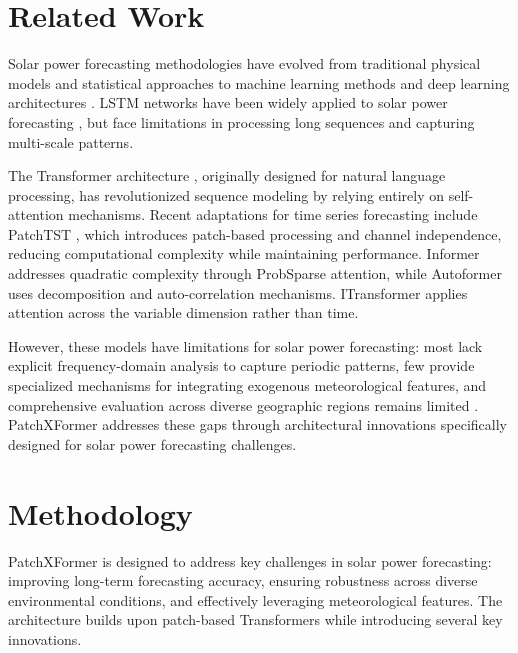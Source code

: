 \documentclass[conference]{IEEEtran}
\begin{document}
\section{Related Work}

Solar power forecasting methodologies have evolved from traditional physical models \cite{de2006improvement} and statistical approaches \cite{box2015time} to machine learning methods \cite{voyant2017machine,persson2017multi} and deep learning architectures \cite{lecun2015deep,han2019review}. LSTM networks \cite{hochreiter1997long} have been widely applied to solar power forecasting \cite{lim2022solar,jebli2021deep}, but face limitations in processing long sequences and capturing multi-scale patterns.

The Transformer architecture \cite{vaswani2017attention}, originally designed for natural language processing, has revolutionized sequence modeling by relying entirely on self-attention mechanisms. Recent adaptations for time series forecasting include PatchTST \cite{nie2022patchtst}, which introduces patch-based processing and channel independence, reducing computational complexity while maintaining performance. Informer \cite{zhou2021informer} addresses quadratic complexity through ProbSparse attention, while Autoformer \cite{wu2021autoformer} uses decomposition and auto-correlation mechanisms. ITransformer \cite{liu2023itransformer} applies attention across the variable dimension rather than time.

However, these models have limitations for solar power forecasting: most lack explicit frequency-domain analysis to capture periodic patterns, few provide specialized mechanisms for integrating exogenous meteorological features, and comprehensive evaluation across diverse geographic regions remains limited \cite{alali2023solar,sherozbek2023transformers}. PatchXFormer addresses these gaps through architectural innovations specifically designed for solar power forecasting challenges.

\section{Methodology}

PatchXFormer is designed to address key challenges in solar power forecasting: improving long-term forecasting accuracy, ensuring robustness across diverse environmental conditions, and effectively leveraging meteorological features. The architecture builds upon patch-based Transformers while introducing several key innovations.
\end{document}
